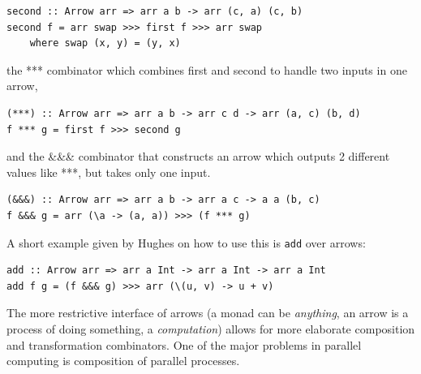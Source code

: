 \begin{lstlisting}[frame=htrbl]
second :: Arrow arr => arr a b -> arr (c, a) (c, b)
second f = arr swap >>> first f >>> arr swap
	where swap (x, y) = (y, x)
\end{lstlisting}
the *** combinator which combines first and second to handle two inputs in one arrow,
\begin{lstlisting}[frame=htrbl]
(***) :: Arrow arr => arr a b -> arr c d -> arr (a, c) (b, d)
f *** g = first f >>> second g
\end{lstlisting}
and the \&\&\& combinator that constructs an arrow which outputs 2 different values like ***, but takes only one input.
\begin{lstlisting}[frame=htrbl]
(&&&) :: Arrow arr => arr a b -> arr a c -> a a (b, c)
f &&& g = arr (\a -> (a, a)) >>> (f *** g)
\end{lstlisting}
A short example given by Hughes on how to use this is \lstinline{add} over arrows:
\begin{lstlisting}[frame=htrbl]
add :: Arrow arr => arr a Int -> arr a Int -> arr a Int
add f g = (f &&& g) >>> arr (\(u, v) -> u + v)
\end{lstlisting}
%
The more restrictive interface of arrows (a monad can be \emph{anything}, an arrow is a process of doing something, a \emph{computation}) allows for more elaborate composition and transformation combinators. One of the major problems in parallel computing is composition of parallel processes.


